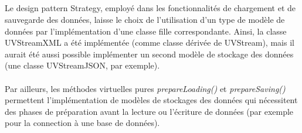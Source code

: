 \documentclass[a4paper,10pt,french]{report}
\begin{document}
			\paragraph{}	
	\subsection{}\label{subsec:IIB}
	
	Le design pattern Strategy, employé dans les fonctionnalités de chargement et de sauvegarde des données, laisse le choix de l'utilisation d'un type de modèle de données par l'implémentation d'une classe fille correspondante.
	Ainsi, la classe UVStreamXML a été implémentée (comme classe dérivée de UVStream), mais il aurait été aussi possible implémenter un second modèle de stockage des données (une classe UVStreamJSON, par exemple).\\\\
	Par ailleurs, les méthodes virtuelles pures \emph{prepareLoading()} et \emph{prepareSaving()} permettent l'implémentation de modèles de stockages des données qui nécessitent des phases de préparation avant la lecture ou l'écriture de données (par exemple pour la connection à une base de données).
	
		\subsubsection{}
			\paragraph{}
			\paragraph{}
			\paragraph{}
		\subsubsection{}
			\paragraph{}
			\paragraph{}
			\paragraph{}
\end{document}
